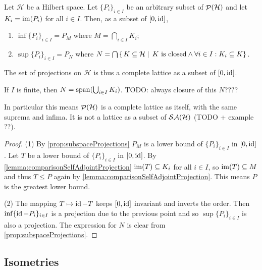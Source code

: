 \begin{proposition}
Let $\mathcal{H}$ be a Hilbert space. Let $\{P_i\}_{i\in I}$ be an arbitrary subset of $\mathop{\mathcal{P}}\nolimits(\mathcal{H})$ and let $K_i = \operatorname{im}(P_i)$ for all $i\in I$. Then, as a subset of $[0,\operatorname{id}]$,
\begin{enumerate}
\item $\inf \{P_i\}_{i\in I} = P_M$ where $M = \bigcap_{i\in I}K_i$;
\item $\sup \{P_i\}_{i\in I} = P_N$ where $N = \bigcap\left\{\left. K \subseteq \mathcal{H} \;\right|\; \text{$K$ is closed} \land \forall i\in I: K_i \subseteq K \right\}$.
\end{enumerate}
The set of projections on $\mathcal{H}$ is thus a complete lattice as a subset of $[0,\operatorname{id}]$.

If $I$ is finite, then $N = \operatorname{span}(\bigcup_{i\in I}K_i)$. TODO: always closure of this $N$????
\end{proposition}
In particular this means $\mathop{\mathcal{P}}\nolimits(\mathcal{H})$ is a complete lattice as itself, with the same suprema and infima. It is not a lattice as a subset of $\mathop{\mathcal{SA}}\nolimits(\mathcal{H})$ (TODO + example ??).
\begin{proof}
(1) By \ref{prop:subspaceProjections} $P_M$ is a lower bound of $\{P_i\}_{i\in I}$ in $[0,\operatorname{id}]$. Let $T$ be a lower bound of $\{P_i\}_{i\in I}$ in $[0,\operatorname{id}]$. By \ref{lemma:comparisonSelfAdjointProjection} $\operatorname{im}(T)\subseteq K_i$ for all $i\in I$, so $\operatorname{im}(T)\subseteq M$ and thus $T\leq P$ again by \ref{lemma:comparisonSelfAdjointProjection}. This means $P$ is the greatest lower bound.

(2) The mapping $T\mapsto \operatorname{id}-T$ keeps $[0,\operatorname{id}]$ invariant and inverts the order. Then $\inf \{\operatorname{id} - P_i\}_{i\in I}$ is a projection due to the previous point and so $\sup \{P_i\}_{i\in I}$ is also a projection. The expression for $N$ is clear from \ref{prop:subspaceProjections}.
\end{proof}

\subsection{Isometries}

